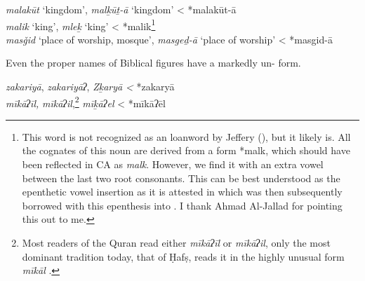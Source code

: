 \documentclass[output=paper]{langsci/langscibook}
\begin{document}
\ea
\ea\textit{malakūt} ‘kingdom’,  \textit{malḵūṯ-ā} ‘kingdom’ < *malakūt-ā\\
\ex\textit{malik} ‘king’,  \textit{mleḵ} ‘king’ < *malik\footnote{This word is not recognized as an  {loanword} by Jeffery (\citeyear[270]{Jeffrey2007}), but it likely is. All the  cognates of this noun are derived from a form *malk, which should have been reflected in CA as \textit{malk}. However, we find it with an extra vowel between the last two {root} consonants. This can be best understood as the epenthetic vowel insertion as it is attested in  which was then subsequently borrowed with this {epenthesis} into . I thank Ahmad Al-Jallad for pointing this out to me.}\\
\ex\textit{masǧid} ‘place of worship, mosque’,  \textit{masgeḏ-ā} ‘place of worship’ < *masgid-ā
\z
\z

\noindent Even the proper names of Biblical figures have a markedly un- form.

\ea
\ea\textit{zakariyā}, \textit{zakariyāʔ},  \textit{Zḵaryā} \textit{<} *zakaryā\\
\ex\textit{mīkāʔīl,} \textit{mīkāʔil},\footnote{Most readers of the {Quran} read either \textit{mīkāʔīl} or \textit{mīkāʔil}, only the most dominant tradition today, that of Ḥafṣ, reads it in the highly unusual form \textit{mīkāl} \citep[166]{IbnMujahid}.}  \textit{mīḵāʔel} < *mīkāʔēl
\z
\z
\end{document}
